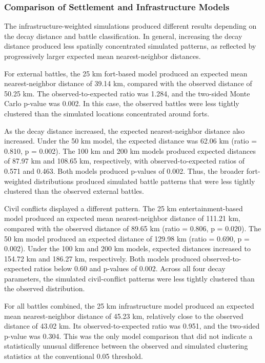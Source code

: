 \documentclass[
  letterpaper,
  DIV=11,
  numbers=noendperiod]{scrartcl}
\begin{document}
\subsubsection{Comparison of Settlement and Infrastructure
Models}\label{comparison-of-settlement-and-infrastructure-models}

The infrastructure-weighted simulations produced different results
depending on the decay distance and battle classification. In general,
increasing the decay distance produced less spatially concentrated
simulated patterns, as reflected by progressively larger expected mean
nearest-neighbor distances.

For external battles, the 25 km fort-based model produced an expected
mean nearest-neighbor distance of 39.14 km, compared with the observed
distance of 50.25 km. The observed-to-expected ratio was 1.284, and the
two-sided Monte Carlo p-value was 0.002. In this case, the observed
battles were less tightly clustered than the simulated locations
concentrated around forts.

As the decay distance increased, the expected nearest-neighbor distance
also increased. Under the 50 km model, the expected distance was 62.06
km (ratio = 0.810, p = 0.002). The 100 km and 200 km models produced
expected distances of 87.97 km and 108.65 km, respectively, with
observed-to-expected ratios of 0.571 and 0.463. Both models produced
p-values of 0.002. Thus, the broader fort-weighted distributions
produced simulated battle patterns that were less tightly clustered than
the observed external battles.

Civil conflicts displayed a different pattern. The 25 km
entertainment-based model produced an expected mean nearest-neighbor
distance of 111.21 km, compared with the observed distance of 89.65 km
(ratio = 0.806, p = 0.020). The 50 km model produced an expected
distance of 129.98 km (ratio = 0.690, p = 0.002). Under the 100 km and
200 km models, expected distances increased to 154.72 km and 186.27 km,
respectively. Both models produced observed-to-expected ratios below
0.60 and p-values of 0.002. Across all four decay parameters, the
simulated civil-conflict patterns were less tightly clustered than the
observed distribution.

For all battles combined, the 25 km infrastructure model produced an
expected mean nearest-neighbor distance of 45.23 km, relatively close to
the observed distance of 43.02 km. Its observed-to-expected ratio was
0.951, and the two-sided p-value was 0.304. This was the only model
comparison that did not indicate a statistically unusual difference
between the observed and simulated clustering statistics at the
conventional 0.05 threshold.
\end{document}

